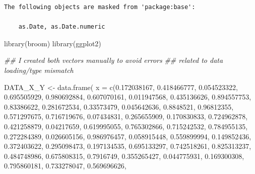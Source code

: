\documentclass[
  11pt,
]{article}
\newenvironment{Shaded}{\begin{snugshade}}{\end{snugshade}}
\newcommand{\AttributeTok}[1]{\textcolor[rgb]{0.40,0.45,0.13}{#1}}
\newcommand{\DocumentationTok}[1]{\textcolor[rgb]{0.37,0.37,0.37}{\textit{#1}}}
\newcommand{\FloatTok}[1]{\textcolor[rgb]{0.68,0.00,0.00}{#1}}
\newcommand{\FunctionTok}[1]{\textcolor[rgb]{0.28,0.35,0.67}{#1}}
\newcommand{\NormalTok}[1]{\textcolor[rgb]{0.00,0.23,0.31}{#1}}
\newcommand{\OtherTok}[1]{\textcolor[rgb]{0.00,0.23,0.31}{#1}}
\begin{document}
\begin{verbatim}
The following objects are masked from 'package:base':

    as.Date, as.Date.numeric
\end{verbatim}

\begin{Shaded}
\begin{Highlighting}[]
\FunctionTok{library}\NormalTok{(broom)}
\FunctionTok{library}\NormalTok{(ggplot2)}


\DocumentationTok{\#\# I created both vectors manually to avoid errors }
\DocumentationTok{\#\# related to data loading/type mismatch }

\NormalTok{DATA\_X\_Y }\OtherTok{\textless{}{-}} \FunctionTok{data.frame}\NormalTok{(}
  \AttributeTok{x =} \FunctionTok{c}\NormalTok{(}\FloatTok{0.172038167}\NormalTok{, }\FloatTok{0.418466777}\NormalTok{, }\FloatTok{0.054523322}\NormalTok{, }\FloatTok{0.695505929}\NormalTok{, }\FloatTok{0.980692884}\NormalTok{, }\FloatTok{0.607070161}\NormalTok{, }
        \FloatTok{0.011947568}\NormalTok{, }\FloatTok{0.435136626}\NormalTok{, }\FloatTok{0.894557753}\NormalTok{, }\FloatTok{0.83386622}\NormalTok{, }\FloatTok{0.281672534}\NormalTok{, }\FloatTok{0.33573479}\NormalTok{, }
        \FloatTok{0.045642636}\NormalTok{, }\FloatTok{0.8848521}\NormalTok{, }\FloatTok{0.96812355}\NormalTok{, }\FloatTok{0.571297675}\NormalTok{, }\FloatTok{0.716719676}\NormalTok{, }\FloatTok{0.07434831}\NormalTok{, }
        \FloatTok{0.265655909}\NormalTok{, }\FloatTok{0.170830833}\NormalTok{, }\FloatTok{0.724962878}\NormalTok{, }\FloatTok{0.421258879}\NormalTok{, }\FloatTok{0.04217659}\NormalTok{, }\FloatTok{0.619995055}\NormalTok{, }
        \FloatTok{0.765302866}\NormalTok{, }\FloatTok{0.715242532}\NormalTok{, }\FloatTok{0.784955135}\NormalTok{, }\FloatTok{0.272284389}\NormalTok{, }\FloatTok{0.026605156}\NormalTok{, }\FloatTok{0.986976457}\NormalTok{, }
        \FloatTok{0.058915448}\NormalTok{, }\FloatTok{0.559899994}\NormalTok{, }\FloatTok{0.149852436}\NormalTok{, }\FloatTok{0.372403622}\NormalTok{, }\FloatTok{0.295098473}\NormalTok{, }\FloatTok{0.197134535}\NormalTok{, }
        \FloatTok{0.695133297}\NormalTok{, }\FloatTok{0.742518261}\NormalTok{, }\FloatTok{0.825313237}\NormalTok{, }\FloatTok{0.484748986}\NormalTok{, }\FloatTok{0.675808315}\NormalTok{, }\FloatTok{0.7916749}\NormalTok{, }
        \FloatTok{0.355265427}\NormalTok{, }\FloatTok{0.044775931}\NormalTok{, }\FloatTok{0.169300308}\NormalTok{, }\FloatTok{0.795860181}\NormalTok{, }\FloatTok{0.733278047}\NormalTok{, }\FloatTok{0.569696626}\NormalTok{, }

\end{Highlighting}
\end{Shaded}
\end{document}
